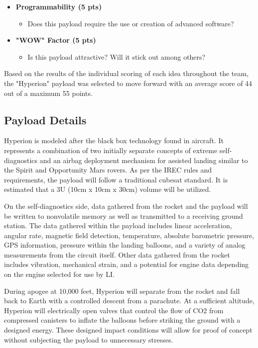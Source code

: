 \documentclass[conference]{IEEEtran} %
\begin{document}
\begin{itemize}
  \item \textbf{Programmability (5 pts)}
  \begin{itemize}
    \item Does this payload require the use or creation of advanced software?
  \end{itemize}

  \item \textbf{"WOW" Factor (5 pts)}
  \begin{itemize}
    \item Is this payload attractive? Will it stick out among others?
  \end{itemize}
\end{itemize}

Based on the results of the individual scoring of each idea throughout the team, the "Hyperion" payload was selected to move forward with
an average score of 44 out of a maximum 55 points.

\subsection{Payload Details}
\label{subsec:Payload Details}
Hyperion is modeled after the black box technology found in aircraft. It represents a combination of two initially separate concepts of extreme self-diagnostics
and an airbag deployment mechanism for assisted landing similar to the Spirit and Opportunity Mars rovers. As per the IREC rules and requirements, the payload will
follow a traditional cubesat standard. It is estimated that a 3U (10cm x 10cm x 30cm) volume will be utilized.

On the self-diagnostics side, data gathered from the rocket and the payload will be written to nonvolatile
memory as well as transmitted to a receiving ground station. The data gathered within the payload includes linear acceleration, angular rate, magnetic field detection,
temperature, absolute barometric pressure, GPS information, pressure within the landing balloons, and a variety of analog measurements from the circuit itself. Other data
gathered from the rocket includes vibration, mechanical strain, and a potential for engine data depending on the engine selected for use by LI.

During apogee at 10,000 feet, Hyperion will separate from the rocket and fall back to Earth with a controlled descent from a parachute. At a sufficient altitude, Hyperion will
electrically open valves that control the flow of CO2 from compressed canisters to inflate the balloons before striking the ground with a designed energy. These designed impact
conditions will allow for proof of concept without subjecting the payload to unnecessary stresses.
\end{document}
